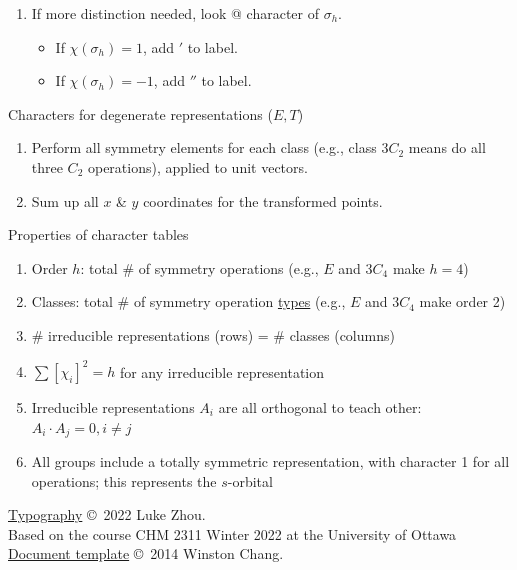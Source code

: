 \documentclass[10pt,landscape]{article}
\begin{document}
\begin{multicols}{3}
\begin{enumerate}
	\item If more distinction needed, look @ character of $\sigma_h$.
	\begin{itemize}
		\item If $\chi(\sigma_h)=1$, add $'$ to label.
		\item If $\chi(\sigma_h)=-1$, add $''$ to label.
	\end{itemize}
\end{enumerate}

Characters for degenerate representations ($E, T$)
\begin{enumerate}
	\item Perform all symmetry elements for each class (e.g., class $3C_2$ means do all three $C_2$ operations), applied to unit vectors.
	\item Sum up all $x$ \& $y$ coordinates for the transformed points.
\end{enumerate}

Properties of character tables
\begin{enumerate}
	\item Order $h$: total \# of symmetry operations (e.g., $E$ and $3C_4$ make $h=4$)
	\item  Classes: total \# of symmetry operation \underline{types} (e.g., $E$ and $3C_4$ make order 2)
	\item \# irreducible representations (rows) = \# classes (columns)
	\item $\sum [\chi_i ]^2 = h$ for any irreducible representation
	\item Irreducible representations $A_i$ are all orthogonal to teach other: ${A_i} \cdot {A_j} = 0, i\neq j$ 
	\item All groups include a totally symmetric representation, with character 1 for all operations; this represents the $s$-orbital
\end{enumerate}



\hrulefill


\scriptsize

\href{https://github.com/zhouluke/PhysicsFormulas}{Typography}  \copyright\ 2022 Luke Zhou. \\
Based on the course CHM 2311 Winter 2022 at the University of Ottawa \\
\href{http://wch.github.io/latexsheet/}{Document template}  \copyright\ 2014 Winston Chang.


\end{multicols}
\end{document}

